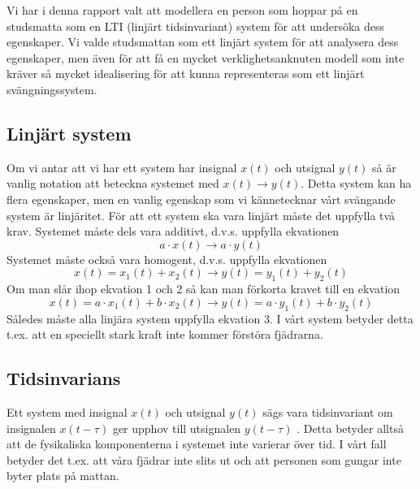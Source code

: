 \documentclass[10pt,a4paper]{article}
\begin{document}
Vi har i denna rapport valt att modellera en person som hoppar på en studsmatta som en LTI (linjärt tidsinvariant) system för att undersöka dess egenskaper. Vi valde studsmattan som ett linjärt system för att analysera dess egenskaper, men även för att få en mycket verklighetsanknuten modell som inte kräver så mycket idealisering för att kunna representeras som ett linjärt svängningssystem.
\newpage

\subsection{Linjärt system}

Om vi antar att vi har ett system har insignal $x(t)$ och utsignal $y(t)$ så är vanlig notation att beteckna systemet med $x(t) \rightarrow y(t)$. Detta system kan ha flera egenskaper, men en vanlig egenskap som vi kännetecknar vårt svängande system är linjäritet. För att ett system ska vara linjärt måste det uppfylla två krav. Systemet måste dels vara additivt, d.v.s. uppfylla ekvationen
\begin{equation}
a \cdot x(t) \rightarrow a \cdot y(t) 
\end{equation}
Systemet måste också vara homogent, d.v.s. uppfylla ekvationen
\begin{equation}
x(t) = x_1(t) + x_2(t) \rightarrow y(t) = y_1(t) + y_2(t)
\end{equation}
Om man slår ihop ekvation 1 och 2 så kan man förkorta kravet till en ekvation
\begin{equation}
x(t) = a \cdot x_1(t) + b \cdot x_2(t)\rightarrow y(t) = a \cdot y_1(t) + b \cdot y_2(t)
\end{equation}
\linebreak
Således måste alla linjära system uppfylla ekvation 3.\cite{sune2000}
I vårt system betyder detta t.ex. att en speciellt stark kraft inte kommer förstöra fjädrarna.


\subsection{Tidsinvarians}


Ett system med insignal $x(t)$ och utsignal $y(t)$ sägs vara tidsinvariant om insignalen $x(t - \tau)$ ger upphov till utsignalen $y(t - \tau)$ \cite{sune2000}. Detta betyder alltså att de fysikaliska komponenterna i systemet inte varierar över tid. I vårt fall betyder det t.ex. att våra fjädrar inte slits ut och att personen som gungar inte byter plats på mattan. 
\end{document}
